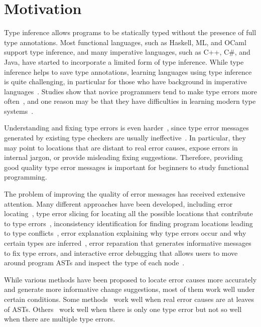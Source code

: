 \documentclass[12pt]{report}	%
\begin{document}
\section{Motivation}
Type inference allows programs to be statically typed without
the presence of full type annotations. Most functional languages,
such as Haskell, ML, and OCaml support type inference, and many
imperative languages, such as C++, C\#, and Java, have started to
incorporate a limited form of type inference.
While type inference helps to save type annotations, learning languages
using type inference is quite challenging,
in particular for those who have background in imperative languages~\cite{clack1995dys,joosten1993teaching}.
Studies show that novice programmers tend to make type errors more often~\cite{chambers2012function,Heeren05:TQT,hage2006mining,tirronen2015understanding}, and
one reason may be that they have difficulties in learning modern type systems~\cite{clack1995dys,chakravarty2004risks}.


Understanding and fixing type errors is even harder~\cite{marceau2011measuring,marceau2011mind,tirronen2015understanding},
since type error messages generated by existing type checkers are usually ineffective~\cite{marceau2011mind}.
In particular, they may point to locations that are distant to real error causes,
expose errors in internal jargon, or provide misleading fixing suggestions.
Therefore, providing good quality type error messages
is important for beginners to study functional programming.

The problem of improving the quality of error messages has received
extensive attention. Many different approaches have been developed,
including error locating~\cite{Mcadam98:UST,Eo04:PSH,Zhang15:DTE,Pavlinovic14:FMT},
type error slicing for locating all the possible locations that
contribute to type errors~\cite{Schilling12:CFT,Haack03:TES},
inconsistency identification for finding program locations leading to
type conflicts~\cite{Yang00:ETE,Wazny06:TIT},
error explanation explaining why type errors occur and why certain
types are inferred~\cite{Chitil01:CET,jun2002explaining,Loncaric16:PFT},
error reparation that generates informative messages to fix type errors,
and interactive error debugging that allows users to move around
program ASTs and inspect the type of each node~\cite{Brassel04:TH,Chitil01:CET}.


While various methods have been proposed to locate
error causes more accurately and 
generate more informative change suggestions,
most of them work well under certain conditions.
Some methods~\cite{CE14popl,CE14flops,Zhang14:tgd}
work well when real error causes are
at leaves of ASTs. Others~\cite{Lerner06:SSM,Pavlinovic15:PST}
work well when there is only one type error but
not so well when there are multiple type errors.
\end{document}
